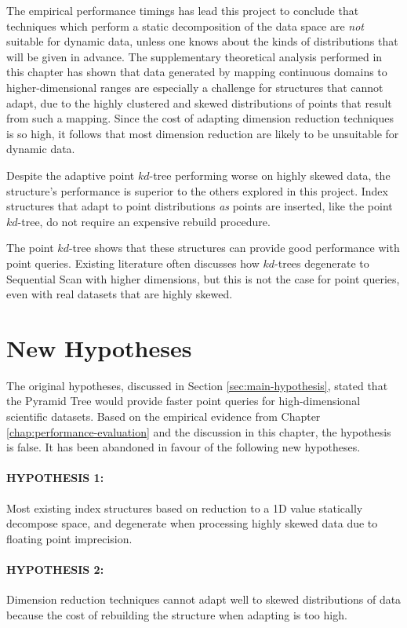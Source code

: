 The empirical performance timings has lead this project to conclude that techniques which perform a static decomposition of the data space are \textit{not} suitable for dynamic data, unless one knows about the kinds of distributions that will be given in advance. The supplementary theoretical analysis performed in this chapter has shown that data generated by mapping continuous domains to higher-dimensional ranges are especially a challenge for structures that cannot adapt, due to the highly clustered and skewed distributions of points that result from such a mapping. Since the cost of adapting dimension reduction techniques is so high, it follows that most dimension reduction are likely to be unsuitable for dynamic data.

Despite the adaptive point $kd$-tree performing worse on highly skewed data, the structure's performance is superior to the others explored in this project. Index structures that adapt to point distributions \textit{as} points are inserted, like the point $kd$-tree, do not require an expensive rebuild procedure.

The point $kd$-tree shows that these structures can provide good performance with point queries. Existing literature often discusses how $kd$-trees degenerate to Sequential Scan with higher dimensions, but this is not the case for point queries, even with real datasets that are highly skewed.

\section{New Hypotheses}

The original hypotheses, discussed in Section \ref{sec:main-hypothesis}, stated that the Pyramid Tree would provide faster point queries for high-dimensional scientific datasets. Based on the empirical evidence from Chapter \ref{chap:performance-evaluation} and the discussion in this chapter, the hypothesis is false. It has been abandoned in favour of the following new hypotheses.

\paragraph{\textbf{HYPOTHESIS 1:}} Most existing index structures based on reduction to a 1D value statically decompose space, and degenerate when processing highly skewed data due to floating point imprecision.

\paragraph{\textbf{HYPOTHESIS 2:}} Dimension reduction techniques cannot adapt well to skewed distributions of data because the cost of rebuilding the structure when adapting is too high.

